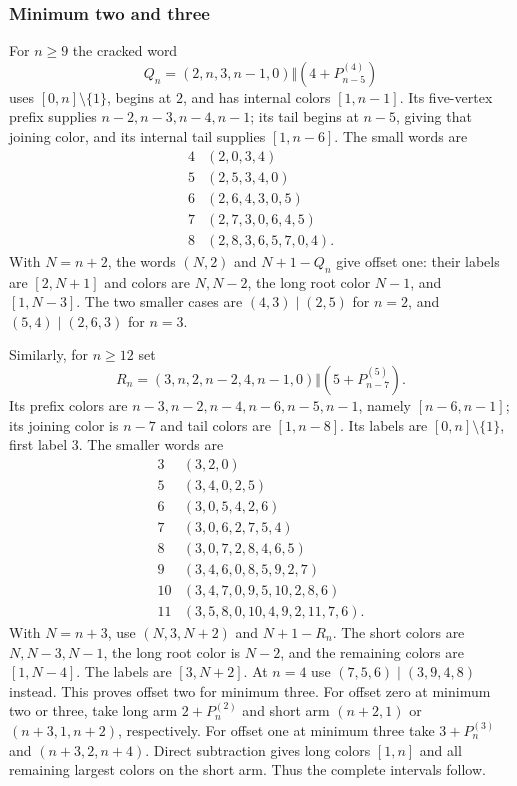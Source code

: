 \subsubsection{Minimum two and three}
For $n\ge9$ the cracked word
\[
Q_n=(2,n,3,n-1,0)\Vert(4+P_{n-5}^{(4)})
\]
uses $[0,n]\setminus\{1\}$, begins at $2$, and has internal colors $[1,n-1]$. Its five-vertex prefix supplies $n-2,n-3,n-4,n-1$; its tail begins at $n-5$, giving that joining color, and its internal tail supplies $[1,n-6]$. The small words are
\[
\begin{array}{c|l}
4&(2,0,3,4)\\5&(2,5,3,4,0)\\6&(2,6,4,3,0,5)\\
7&(2,7,3,0,6,4,5)\\8&(2,8,3,6,5,7,0,4).
\end{array}
\]
With $N=n+2$, the words $(N,2)$ and $N+1-Q_n$ give offset one: their labels are $[2,N+1]$ and colors are $N,N-2$, the long root color $N-1$, and $[1,N-3]$. The two smaller cases are $(4,3)\mid(2,5)$ for $n=2$, and $(5,4)\mid(2,6,3)$ for $n=3$.

Similarly, for $n\ge12$ set
\[
R_n=(3,n,2,n-2,4,n-1,0)\Vert(5+P_{n-7}^{(5)}).
\]
Its prefix colors are $n-3,n-2,n-4,n-6,n-5,n-1$, namely $[n-6,n-1]$; its joining color is $n-7$ and tail colors are $[1,n-8]$. Its labels are $[0,n]\setminus\{1\}$, first label $3$. The smaller words are
\[
\begin{array}{c|l}
3&(3,2,0)\\5&(3,4,0,2,5)\\6&(3,0,5,4,2,6)\\7&(3,0,6,2,7,5,4)\\
8&(3,0,7,2,8,4,6,5)\\9&(3,4,6,0,8,5,9,2,7)\\
10&(3,4,7,0,9,5,10,2,8,6)\\11&(3,5,8,0,10,4,9,2,11,7,6).
\end{array}
\]
With $N=n+3$, use $(N,3,N+2)$ and $N+1-R_n$. The short colors are $N,N-3,N-1$, the long root color is $N-2$, and the remaining colors are $[1,N-4]$. The labels are $[3,N+2]$. At $n=4$ use $(7,5,6)\mid(3,9,4,8)$ instead. This proves offset two for minimum three.
For offset zero at minimum two or three, take long arm $2+P_n^{(2)}$ and short arm $(n+2,1)$ or $(n+3,1,n+2)$, respectively. For offset one at minimum three take $3+P_n^{(3)}$ and $(n+3,2,n+4)$. Direct subtraction gives long colors $[1,n]$ and all remaining largest colors on the short arm. Thus the complete intervals follow.

